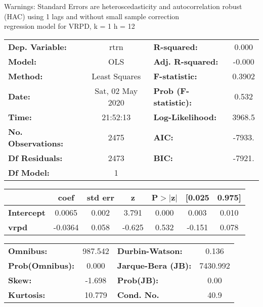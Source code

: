 Warnings: \newline
 [1] Standard Errors are heteroscedasticity and autocorrelation robust (HAC) using 1 lags and without small sample correction\\ 

regression model for VRPD, k = 1 h = 12\begin{center}
\begin{tabular}{lclc}
\toprule
\textbf{Dep. Variable:}    &       rtrn       & \textbf{  R-squared:         } &     0.000   \\
\textbf{Model:}            &       OLS        & \textbf{  Adj. R-squared:    } &    -0.000   \\
\textbf{Method:}           &  Least Squares   & \textbf{  F-statistic:       } &    0.3902   \\
\textbf{Date:}             & Sat, 02 May 2020 & \textbf{  Prob (F-statistic):} &    0.532    \\
\textbf{Time:}             &     21:52:13     & \textbf{  Log-Likelihood:    } &    3968.5   \\
\textbf{No. Observations:} &        2475      & \textbf{  AIC:               } &    -7933.   \\
\textbf{Df Residuals:}     &        2473      & \textbf{  BIC:               } &    -7921.   \\
\textbf{Df Model:}         &           1      & \textbf{                     } &             \\
\bottomrule
\end{tabular}
\begin{tabular}{lcccccc}
                   & \textbf{coef} & \textbf{std err} & \textbf{z} & \textbf{P$> |$z$|$} & \textbf{[0.025} & \textbf{0.975]}  \\
\midrule
\textbf{Intercept} &       0.0065  &        0.002     &     3.791  &         0.000        &        0.003    &        0.010     \\
\textbf{vrpd}      &      -0.0364  &        0.058     &    -0.625  &         0.532        &       -0.151    &        0.078     \\
\bottomrule
\end{tabular}
\begin{tabular}{lclc}
\textbf{Omnibus:}       & 987.542 & \textbf{  Durbin-Watson:     } &    0.136  \\
\textbf{Prob(Omnibus):} &   0.000 & \textbf{  Jarque-Bera (JB):  } & 7430.992  \\
\textbf{Skew:}          &  -1.698 & \textbf{  Prob(JB):          } &     0.00  \\
\textbf{Kurtosis:}      &  10.779 & \textbf{  Cond. No.          } &     40.9  \\
\bottomrule
\end{tabular}
\end{center}

